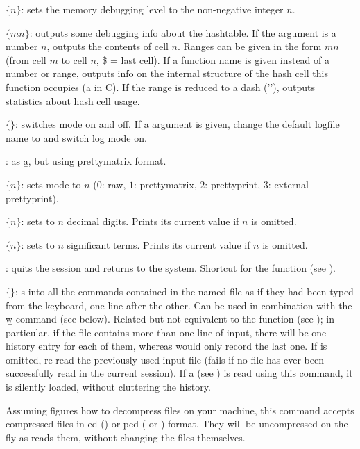  $\{n\}$: sets the memory debugging level 
to the non-negative integer $n$.

 $\{m$\kbd{-}$n\}$: outputs some debugging info about the
hashtable. If the argument is a number $n$, outputs the contents of cell
$n$. Ranges can be given in the form $m$\kbd{-}$n$ (from cell $m$ to cell
$n$, \$ = last cell). If a function name is given instead of a number or
range, outputs info on the internal structure of the hash cell this
function occupies (a  in C). If the range is reduced to
a dash ('\kbd{-}'), outputs statistics about hash cell usage.

 $\{$$\}$: switches  mode on and off.
If a  argument is given, change the default logfile name to
 and switch log mode on.

: as \b{a}, but using prettymatrix format.

 $\{n\}$: sets  mode to $n$ ($0$: raw, $1$:
prettymatrix, $2$: prettyprint, $3$: external prettyprint).

 $\{n\}$: sets  to $n$ decimal
digits. Prints its current value if $n$ is omitted.

 $\{n\}$: sets  to $n$ significant terms.
Prints its current value if $n$ is omitted.

: quits the  session and returns to the system.
Shortcut for the function  (see ).

 $\{$$\}$: s into  all the
commands contained in the named file as if they had been typed from the
keyboard, one line after the other. Can be used in combination with the \b{w}
command (see below). Related but not equivalent to the function 
(see ); in particular, if the file contains more than one
line of input, there will be one history entry for each of them, whereas
 would only record the last one. If  is omitted,
re-read the previously used input file (fails if no file has ever been
successfully read in the current session). If a  
(see ) is read using this command, it is silently loaded,
without cluttering the history.

Assuming  figures how to decompress files on your machine, this
command accepts compressed files in ed () or
ped ( or ) format. They will be uncompressed on
the fly as  reads them, without changing the files themselves.

